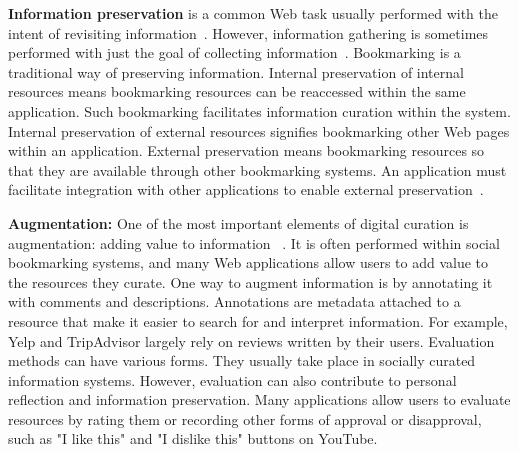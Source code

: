 \documentclass{sigchi}
\newcommand{\feature}[1]{{\ttfamily#1}}
\begin{document}
{{\textbf{Information preservation} is a common Web task usually performed with the intent of revisiting information~\cite{abrams1998information,whittaker2011personal}. However, information gathering is sometimes performed with just the goal of collecting information~\cite{lindley2012s}. 
%
Bookmarking is a traditional way of preserving information. \feature{Internal preservation of internal resources} means bookmarking resources can be reaccessed within the same application. Such bookmarking facilitates information curation within the system. \feature{Internal preservation of external resources} signifies bookmarking other Web pages within an application. \feature{External preservation} means bookmarking resources so that they are available through other bookmarking systems. An application must facilitate integration with other applications to enable external preservation~\cite{abrams1998information}.
%

\textbf{Augmentation:}
One of the most important elements of digital curation is augmentation: adding value to information ~\cite{beagrie2008digital,whittaker2011personal}. It is often performed within social bookmarking systems, and many Web applications allow users to add value to the resources they curate. 
%
One way to augment information is by \feature{annotating} it with comments and descriptions. Annotations are metadata attached to a resource that make it easier to search for and interpret information. For example, Yelp and TripAdvisor largely rely on reviews written by their users. 
%
\feature{Evaluation} methods can have various forms. They usually take place in socially curated information systems. However, evaluation can also contribute to personal reflection and information preservation. Many applications allow users to evaluate resources by rating them or recording other forms of approval or disapproval, such as "I like this" and "I dislike this" buttons on YouTube.

}}
\end{document}
